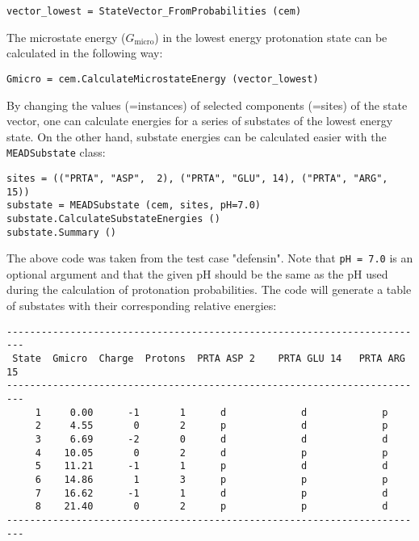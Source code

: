 \documentclass[a4paper,11pt]{article}
\begin{document}
{{\footnotesize \begin{lstlisting}
vector_lowest = StateVector_FromProbabilities (cem)
\end{lstlisting} }

\bigskip
The microstate energy ($G_{\mathrm{micro}}$) in the lowest energy protonation state can 
be calculated in the following way:

{\footnotesize \begin{lstlisting}
Gmicro = cem.CalculateMicrostateEnergy (vector_lowest)
\end{lstlisting} }

\bigskip
By changing the values (=instances) of selected components (=sites) of the state vector, 
one can calculate energies for a series of substates of the lowest energy state.
%
On the other hand, substate energies can be calculated easier with the \texttt{MEADSubstate} class:

{\footnotesize \begin{lstlisting}
sites = (("PRTA", "ASP",  2), ("PRTA", "GLU", 14), ("PRTA", "ARG", 15))
substate = MEADSubstate (cem, sites, pH=7.0)
substate.CalculateSubstateEnergies ()
substate.Summary ()
\end{lstlisting} }

\bigskip
The above code was taken from the test case "defensin".
%
Note that \texttt{pH = 7.0} is an optional argument and that the given pH should be the same
as the pH used during the calculation of protonation probabilities.
%
The code will generate a table of substates with their corresponding relative energies:

\linespread{0.8}
{\footnotesize \begin{lstlisting}
-------------------------------------------------------------------------
 State  Gmicro  Charge  Protons  PRTA ASP 2    PRTA GLU 14   PRTA ARG 15
-------------------------------------------------------------------------
     1     0.00      -1       1      d             d             p       
     2     4.55       0       2      p             d             p       
     3     6.69      -2       0      d             d             d       
     4    10.05       0       2      d             p             p       
     5    11.21      -1       1      p             d             d       
     6    14.86       1       3      p             p             p       
     7    16.62      -1       1      d             p             d       
     8    21.40       0       2      p             p             d       
-------------------------------------------------------------------------
\end{lstlisting} }
\linespread{1.6}

}
\end{document}
